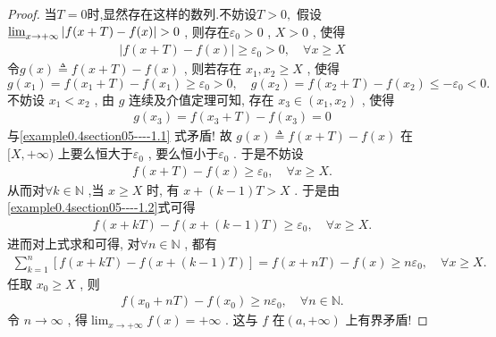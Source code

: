 \documentclass[../../main.tex]{subfiles}%
\begin{document}
\begin{proof}
当$T=0$时,显然存在这样的数列.不妨设$T>0,$
假设\(\varliminf_{x \to +\infty} \vert f(x + T) - f(x)\vert > 0\) , 则存在\(\varepsilon_0 > 0\) , \(X > 0\) , 使得
\begin{align}
\vert f(x + T) - f(x)\vert \geqslant \varepsilon_0>0,\quad \forall x \geqslant X \label{example0.4section05----1.1}
\end{align}
令\(g(x) \triangleq f(x + T) - f(x)\) , 则若存在 \(x_1, x_2 \geqslant X\) , 使得
\[g(x_1) = f(x_1 + T) - f(x_1) \geqslant \varepsilon_0 > 0 ,\quad g(x_2) = f(x_2 + T) - f(x_2) \leqslant -\varepsilon_0 < 0. \]
不妨设 \(x_1 < x_2\) , 由 \(g\) 连续及介值定理可知, 存在 \(x_3 \in (x_1, x_2)\) , 使得
\begin{align*}
g(x_3) = f(x_3 + T) - f(x_3) = 0
\end{align*}
与\eqref{example0.4section05----1.1} 式矛盾! 故 \(g(x) \triangleq f(x + T) - f(x)\) 在\([X, +\infty)\) 上要么恒大于\(\varepsilon_0\) , 要么恒小于\(\varepsilon_0\) . 于是不妨设
\begin{align}
f(x + T) - f(x) \geqslant \varepsilon_0,\quad \forall x \geqslant X .\label{example0.4section05----1.2}
\end{align}
从而对\(\forall k \in \mathbb{N}\) ,当 \(x \geqslant X\) 时, 有
\(x + (k - 1)T > X\) .
于是由\eqref{example0.4section05----1.2}式可得
\begin{align*}
f(x + kT) - f(x + (k - 1)T) \geqslant \varepsilon_0,\quad \forall x \geqslant X. 
\end{align*}
进而对上式求和可得, 对\(\forall n \in \mathbb{N}\) , 都有
\begin{align*}
\sum_{k = 1}^n [f(x + kT) - f(x + (k - 1)T)] = f(x + nT) - f(x) \geqslant n\varepsilon_0,\quad \forall x \geqslant X.
\end{align*}
任取 \(x_0 \geqslant X\) , 则
\begin{align*}
f(x_0 + nT) - f(x_0) \geqslant n\varepsilon_0,\quad \forall n \in \mathbb{N}.
\end{align*}
令 \(n \to \infty\) , 得\(\lim_{x \to +\infty} f(x) = +\infty\) . 这与 \(f\) 在\((a, +\infty)\) 上有界矛盾! 
\end{proof}
\end{document}
